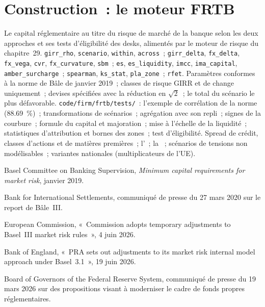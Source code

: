 \section{Construction~: le moteur FRTB}\label{bld:rc:regulatory-capital-for-trading-books:frtb}

\begin{build}
 Le capital réglementaire au titre du risque de marché de la banque selon les deux approches et ses
tests d'éligibilité des desks, alimentés par le moteur de risque du chapitre~29.
 \texttt{girr\_rho}, \texttt{scenario}, \texttt{within}, \texttt{across}~;
\texttt{girr\_delta}, \texttt{fx\_delta}, \texttt{fx\_vega}, \texttt{cvr}, \texttt{fx\_curvature},
\texttt{sbm}~; \texttt{es}, \texttt{es\_liquidity}, \texttt{imcc}, \texttt{ima\_capital},
\texttt{amber\_surcharge}~; \texttt{spearman}, \texttt{ks\_stat}, \texttt{pla\_zone}~;
\texttt{rfet}.
 Paramètres conformes à la norme de Bâle de janvier 2019~; classes de risque GIRR et de change
uniquement~; devises spécifiées avec la réduction en $\sqrt2$~; le total du scénario le plus défavorable.
 \texttt{code/firm/frtb/tests/}~: l'exemple de corrélation de la norme
(88.69~\%)~; transformations de scénarios~; agrégation avec son repli~; signes de la courbure~; formule du capital
et majoration~; mise à l'échelle de la liquidité~; statistiques d'attribution et bornes des zones~; test d'éligibilité.
 Spread de crédit, classes d'actions et de matières premières~; l'~; la
~; scénarios de tensions non modélisables~; variantes nationales (multiplicateurs de l'UE).
\end{build}

\begin{omsources}
\item Basel Committee on Banking Supervision, \emph{Minimum capital requirements for market
risk}, janvier 2019.
\item Bank for International Settlements, communiqué de presse du 27 mars 2020 sur le report de Bâle~III.
\item European Commission, «~Commission adopts temporary adjustments to Basel~III market risk
rules~», 4 juin 2026.
\item Bank of England, «~PRA sets out adjustments to its market risk internal model approach
under Basel~3.1~», 19 juin 2026.
\item Board of Governors of the Federal Reserve System, communiqué de presse du 19 mars 2026 sur
des propositions visant à moderniser le cadre de fonds propres réglementaires.
\end{omsources}


